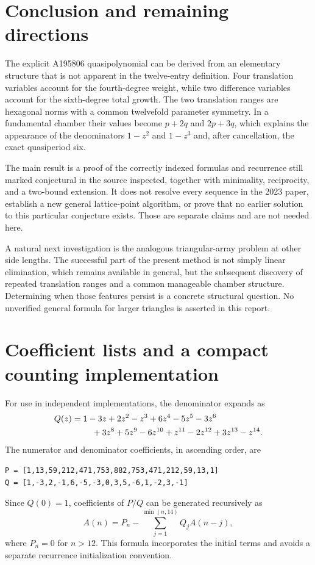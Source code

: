 \documentclass[11pt]{article}
\numberwithin{equation}{section}
\theoremstyle{definition}
\begin{document}
\section{Conclusion and remaining directions}

The explicit A195806 quasipolynomial can be derived from an elementary
structure that is not apparent in the twelve-entry definition. Four
translation variables account for the fourth-degree weight, while two
difference variables account for the sixth-degree total growth. The two
translation ranges are hexagonal norms with a common twelvefold parameter
symmetry. In a fundamental chamber their values become $p+2q$ and $2p+3q$,
which explains the appearance of the denominators $1-z^2$ and $1-z^3$ and,
after cancellation, the exact quasiperiod six.

The main result is a proof of the correctly indexed formulas and recurrence
still marked conjectural in the source inspected, together with minimality,
reciprocity, and a two-bound extension. It does not resolve every sequence in
the 2023 paper, establish a new general lattice-point algorithm, or prove that
no earlier solution to this particular conjecture exists. Those are separate
claims and are not needed here.

A natural next investigation is the analogous triangular-array problem at
other side lengths. The successful part of the present method is not simply
linear elimination, which remains available in general, but the subsequent
discovery of repeated translation ranges and a common manageable chamber
structure. Determining when those features persist is a concrete structural
question. No unverified general formula for larger triangles is asserted in
this report.

\appendix
\section{Coefficient lists and a compact counting implementation}
\label{app:implementation}

For use in independent implementations, the denominator expands as
\begin{align*}
 Q(z)={}&1-3z+2z^2-z^3+6z^4-5z^5-3z^6\notag\\
       &\quad+3z^8+5z^9-6z^{10}+z^{11}-2z^{12}+3z^{13}-z^{14}.
\end{align*}
The numerator and denominator coefficients, in ascending order, are
\begin{verbatim}
P = [1,13,59,212,471,753,882,753,471,212,59,13,1]
Q = [1,-3,2,-1,6,-5,-3,0,3,5,-6,1,-2,3,-1]
\end{verbatim}
Since $Q(0)=1$, coefficients of $P/Q$ can be generated recursively as
\[
 A(n)=P_n-\sum_{j=1}^{\min(n,14)}Q_jA(n-j),
\]
where $P_n=0$ for $n>12$. This formula incorporates the initial terms and
avoids a separate recurrence initialization convention.
\end{document}
